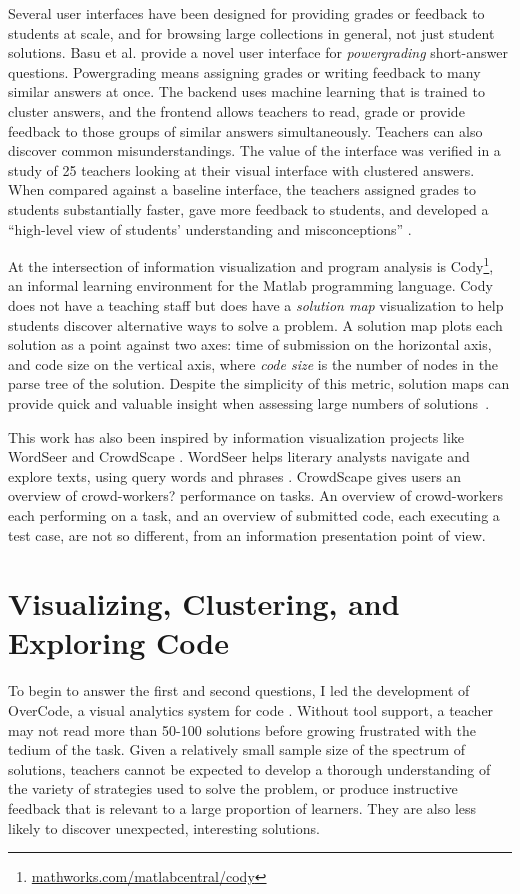 \documentclass{sigchi}
\begin{document}
Several user interfaces have been designed for providing grades or feedback to students at scale, and for browsing large collections in general, not just student solutions. Basu et al. \citeyear{basupowergrading} provide a novel user interface for {\it powergrading} short-answer questions. Powergrading means assigning grades or writing feedback to many similar answers at once. The backend uses machine learning that is trained to cluster answers, and the frontend allows teachers to read, grade or provide feedback to those groups of similar answers simultaneously. Teachers can also discover common misunderstandings. The value of the interface was verified in a study of 25 teachers looking at their visual interface with clustered answers. When compared against a baseline interface, the teachers assigned grades to students substantially faster, gave more feedback to students, and developed a ``high-level view of students' understanding and misconceptions'' \cite{basuDivideAndConquer}.

At the intersection of information visualization and program analysis is Cody\footnote{\url{mathworks.com/matlabcentral/cody}}, an informal learning environment for the Matlab programming language. Cody does not have a teaching staff but does have a {\em solution map} visualization to help students discover alternative ways to solve a problem. A solution map plots each solution as a point against two axes: time of submission on the horizontal axis, and code size on the vertical axis, where \textit{code size} is the number of nodes in the parse tree of the solution. Despite the simplicity of this metric, solution maps can provide quick and valuable insight when assessing large numbers of solutions~\cite{ICERGlassman}.

This work has also been inspired by information visualization projects like WordSeer \cite{wordseerlitcomp13,wordseercikm13} and CrowdScape \cite{crowdscape}. WordSeer helps literary analysts navigate and explore texts, using query words and phrases \cite{wordseerhcir11}. CrowdScape gives users an overview of crowd-workers? performance on tasks. An overview of crowd-workers each performing on a task, and an overview of submitted code, each executing a test case, are not so different, from an information presentation point of view.

\section{Visualizing, Clustering, and Exploring Code}
To begin to answer the first and second questions, I led the development of OverCode, a visual analytics system for code \cite{OverCode}. Without tool support, a teacher may not read more than 50-100 solutions before growing frustrated with the tedium of the task. Given a relatively small sample size of the spectrum of solutions, teachers cannot be expected to develop a thorough understanding of the variety of strategies used to solve the problem, or produce instructive feedback that is relevant to a large proportion of learners. They are also less likely to discover unexpected, interesting solutions.
\end{document}
